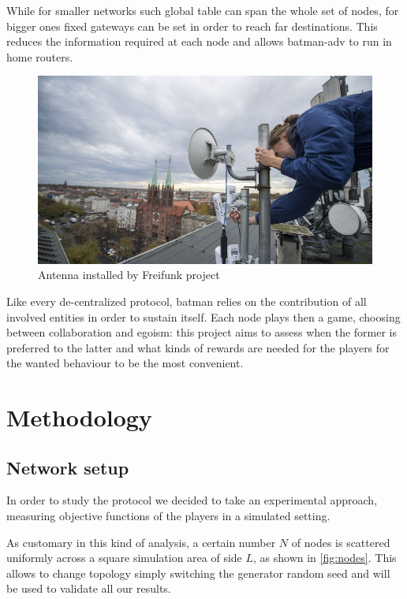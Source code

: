 \documentclass[conference,10.5pt]{IEEEtran}
\begin{document}
While for smaller networks such global table can span the whole set of nodes, for bigger ones fixed gateways can be set in order to reach far destinations. This reduces the information required at each node and allows \gls{batman}-adv to run in home routers.

\begin{figure}[h]
  \centering
  \includegraphics[width=0.8\linewidth]{figures/batman_antenna}
  \caption{Antenna installed by Freifunk project}
  \label{fig:freifunk_img}
\end{figure}

\smallskip

Like every de-centralized protocol, \gls{batman} relies on the contribution of all involved entities in order to sustain itself. Each node plays then a game, choosing between collaboration and egoism: this project aims to assess when the former is preferred to the latter and what kinds of rewards are needed for the players for the wanted behaviour to be the most convenient.

\section{Methodology}

\subsection{Network setup}

In order to study the protocol we decided to take an experimental approach, measuring objective functions of the players in a simulated setting.

As customary in this kind of analysis, a certain number $N$ of nodes is scattered uniformly across a square simulation area of side $L$, as shown in \autoref{fig:nodes}. This allows to change topology simply switching the generator random seed and will be used to validate all our results.
\end{document}
